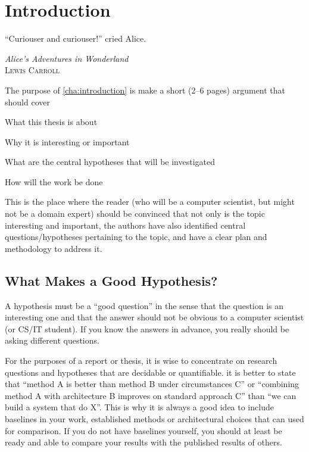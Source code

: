 \chapter{Introduction}
\label{cha:introduction}
\epigraph{``Curiouser and curiouser!'' cried Alice.}{\textit{Alice’s Adventures in Wonderland}\\\textsc{Lewis Carroll}}

The purpose of \autoref{cha:introduction} is make a short (2--6 pages)
argument that should cover
\begin{aenumerate}
\item What this thesis is about
\item Why it is interesting or important
\item What are the central hypotheses that will be investigated 
\item How will the work be done
\end{aenumerate}

This is the place where the reader (who will be a computer scientist, but
might not be a domain expert) should be convinced that not only is the topic
interesting and important, the authors have also identified central
questions/hypotheses pertaining to the topic, and have a clear plan and
methodology to address it.

\section{What Makes a Good Hypothesis?}
\label{sec:what-makes-good}

A hypothesis must be a ``good question'' in the sense that the question is
an interesting one and that the answer should not be obvious to a computer
scientist (or CS/IT student).  If you know the answers in advance, you
really should be asking different questions.

For the purposes of a report or thesis, it is wise to concentrate on
research questions and hypotheses that are decidable or quantifiable. \Eg it
is better to state that ``method A is better than method B under
circumstances C'' or ``combining method A with architecture B improves on
standard approach C'' than ``we can build a system that do X''.  This is why
it is always a good idea to include baselines in your work, \ie established
methods or architectural choices that can used for comparison. If you do not
have baselines yourself, you should at least be ready and able to compare
your results with the published results of others.

